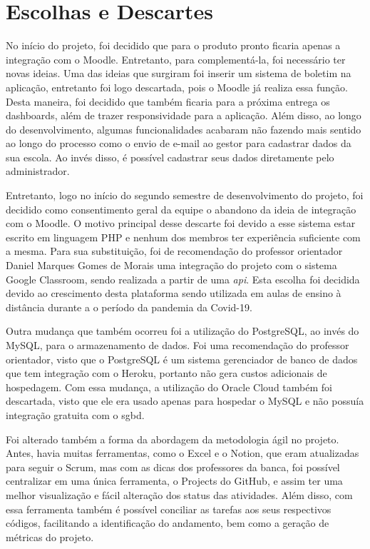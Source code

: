 \section{Escolhas e Descartes}
No início do projeto, foi decidido que para o produto pronto ficaria apenas a integração com o Moodle. Entretanto, para complementá-la, foi necessário ter novas ideias. Uma das ideias que surgiram foi inserir um sistema de boletim na aplicação, entretanto foi logo descartada, pois o Moodle já realiza essa função. Desta maneira, foi decidido que também ficaria para a próxima entrega os \glspl{dashboard}, além de trazer responsividade para a aplicação. Além disso, ao longo do desenvolvimento, algumas funcionalidades acabaram não fazendo mais sentido ao longo do processo como o envio de e-mail ao gestor para cadastrar dados da sua escola. Ao invés disso, é possível cadastrar seus dados diretamente pelo administrador.

Entretanto, logo no início do segundo semestre de desenvolvimento do projeto, foi decidido como consentimento geral da equipe o abandono da ideia de integração com o Moodle. O motivo principal desse descarte foi devido a esse sistema estar escrito em linguagem PHP e nenhum dos membros ter experiência suficiente com a mesma. Para sua substituição, foi de recomendação do professor orientador Daniel Marques Gomes de Morais uma integração do projeto com o sistema Google Classroom, sendo realizada a partir de uma \textit{\ac{api}}. Esta escolha foi decidida devido ao crescimento desta plataforma sendo utilizada em aulas de ensino à distância durante a o período da pandemia da Covid-19.

Outra mudança que também ocorreu foi a utilização do PostgreSQL, ao invés do MySQL, para o armazenamento de dados. Foi uma recomendação do professor orientador, visto que o PostgreSQL é um sistema gerenciador de banco de dados que tem integração com o Heroku, portanto não gera custos adicionais de hospedagem. Com essa mudança, a utilização do Oracle Cloud também foi descartada, visto que ele era usado apenas para hospedar o MySQL e não possuía integração gratuita com o \ac{sgbd}.

Foi alterado também a forma da abordagem da metodologia ágil no projeto. Antes, havia muitas ferramentas, como o Excel e o Notion, que eram atualizadas para seguir o Scrum, mas com as dicas dos professores da banca, foi possível centralizar em uma única ferramenta, o Projects do GitHub, e assim ter uma melhor visualização e fácil alteração dos status das atividades. Além disso, com essa ferramenta também é possível conciliar as tarefas aos seus respectivos códigos, facilitando a identificação do andamento, bem como a geração de métricas do projeto.
